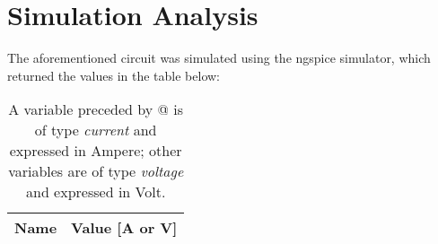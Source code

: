 \section{Simulation Analysis}
\label{sec:simulation}

\par
The aforementioned circuit was simulated using the ngspice simulator, which returned the values in the table below:
\par

\begin{table}[h]
  \centering
  \begin{tabular}{|l|r|}
    \hline    
    {\bf Name} & {\bf Value [A or V]} \\ \hline
    
  \end{tabular}
  \caption{A variable preceded by @ is of type {\em current} and expressed in Ampere; other variables are of type {\it voltage} and expressed in Volt.}
  \label{tab:sim}
\end{table}



